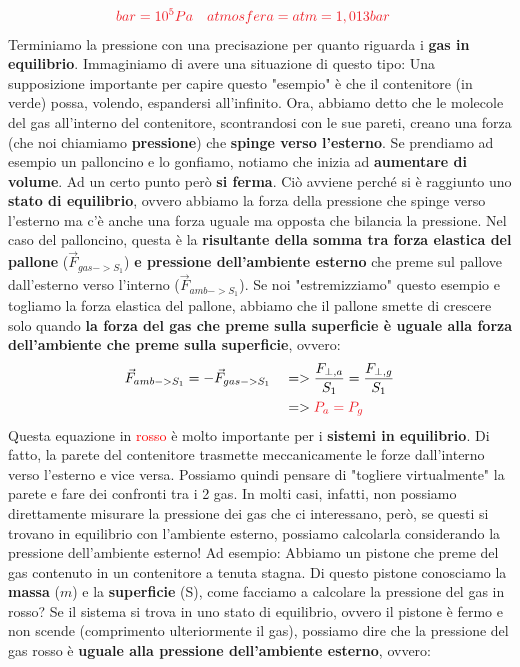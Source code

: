                 \begin{align*}
                    &\textcolor{Red}{bar = 10^5Pa}&&\textcolor{Red}{atmosfera=atm=1,013bar}
                \end{align*}
                Terminiamo la pressione con una precisazione per quanto riguarda i \textbf{gas in equilibrio}. Immaginiamo di avere una situazione di questo tipo:
                Una supposizione importante per capire questo "esempio" è che il contenitore (in verde) possa, volendo, espandersi all'infinito. Ora, abbiamo detto che le molecole del gas all'interno del contenitore, scontrandosi con le sue pareti, creano una forza (che noi chiamiamo \textbf{pressione}) che \textbf{spinge verso l'esterno}. Se prendiamo ad esempio un palloncino e lo gonfiamo, notiamo che inizia ad \textbf{aumentare di volume}. Ad un certo punto però \textbf{si ferma}. Ciò avviene perché si è raggiunto uno \textbf{stato di equilibrio}, ovvero abbiamo la forza della pressione che spinge verso l'esterno ma c'è anche una forza uguale ma opposta che bilancia la pressione. Nel caso del palloncino, questa è la \textbf{risultante della somma tra forza elastica del pallone} ($\vec{F}_{gas->S_1}$) \textbf{e pressione dell'ambiente esterno} che preme sul pallove dall'esterno verso l'interno ($\vec{F}_{amb->S_1}$). Se noi "estremizziamo" questo esempio e togliamo la forza elastica del pallone, abbiamo che il pallone smette di crescere solo quando \textbf{la forza del gas che preme sulla superficie è uguale alla forza dell'ambiente che preme sulla superficie}, ovvero:
                \begin{align*}
                    &\vec{F}_{amb->S_1} = -\vec{F}_{gas->S_1}&&=>\frac{F_{\bot,a}}{S_1}=\frac{F_{\bot,g}}{S_1}\\
                    & && =>\textcolor{Red}{P_a=P_g}
                \end{align*}
                Questa equazione in \textcolor{Red}{rosso} è molto importante per i \textbf{sistemi in equilibrio}. Di fatto, la parete del contenitore trasmette meccanicamente le forze dall'interno verso l'esterno e vice versa. Possiamo quindi pensare di "togliere virtualmente" la parete e fare dei confronti tra i 2 gas. In molti casi, infatti, non possiamo direttamente misurare la pressione dei gas che ci interessano, però, se questi si trovano in equilibrio con l'ambiente esterno, possiamo calcolarla considerando la pressione dell'ambiente esterno! Ad esempio:
                Abbiamo un pistone che preme del gas contenuto in un contenitore a tenuta stagna. Di questo pistone conosciamo la \textbf{massa} ($m$) e la \textbf{superficie} (S), come facciamo a calcolare la pressione del gas in rosso? Se il sistema si trova in uno stato di equilibrio, ovvero il pistone è fermo e non scende (comprimento ulteriormente il gas), possiamo dire che la pressione del gas rosso è \textbf{uguale alla pressione dell'ambiente esterno}, ovvero:
